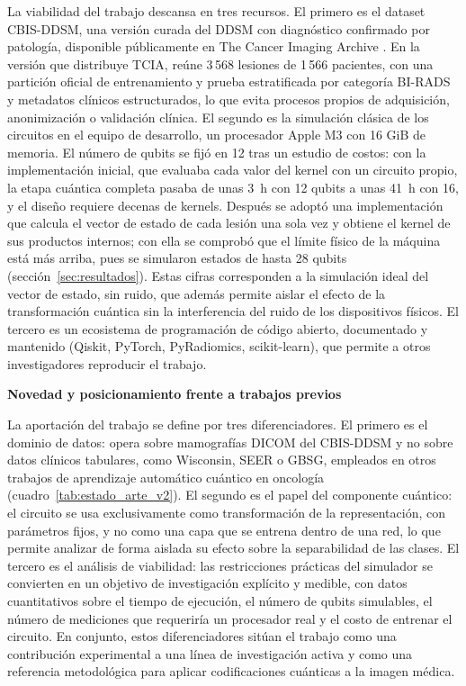 La viabilidad del trabajo descansa en tres recursos. El primero es el dataset CBIS-DDSM, una versión
curada del DDSM con diagnóstico confirmado por patología, disponible públicamente en The Cancer
Imaging Archive \cite{Lee2017CBISDDSM, Clark2013TCIA}. En la versión que distribuye TCIA, reúne 3\,568 lesiones de 1\,566 pacientes, con
una partición oficial de entrenamiento y prueba estratificada por categoría BI-RADS y metadatos
clínicos estructurados, lo que evita procesos propios de adquisición, anonimización o validación
clínica. El segundo es la simulación clásica de los circuitos en el equipo de desarrollo, un
procesador Apple M3 con 16 GiB de memoria. El número de qubits se fijó en 12 tras un estudio de
costos: con la implementación inicial, que evaluaba cada valor del kernel con un circuito propio, la
etapa cuántica completa pasaba de unas 3~h con 12 qubits a unas 41~h con 16, y el diseño requiere
decenas de kernels. Después se adoptó una implementación que calcula el vector de estado de cada
lesión una sola vez y obtiene el kernel de sus productos internos; con ella se comprobó que el límite
físico de la máquina está más arriba, pues se simularon estados de hasta 28 qubits
(sección~\ref{sec:resultados}). Estas cifras corresponden a la simulación ideal del vector de estado,
sin ruido, que además permite aislar el efecto de la transformación cuántica sin la interferencia del
ruido de los dispositivos físicos. El tercero es un ecosistema de
programación de código abierto, documentado y mantenido (Qiskit, PyTorch, PyRadiomics, scikit-learn),
que permite a otros investigadores reproducir el trabajo.

\textbf{Novedad y posicionamiento frente a trabajos previos}

La aportación del trabajo se define por tres diferenciadores. El primero es el dominio de datos:
opera sobre mamografías DICOM del CBIS-DDSM y no sobre datos clínicos tabulares, como Wisconsin, SEER o
GBSG, empleados en otros trabajos de aprendizaje automático cuántico en oncología
(cuadro~\ref{tab:estado_arte_v2}). El segundo es el papel del componente cuántico: el circuito se usa
exclusivamente como transformación de la representación, con parámetros fijos, y no como una capa que
se entrena dentro de una red, lo que permite analizar de forma aislada su efecto sobre la
separabilidad de las clases. El tercero es el análisis de viabilidad: las restricciones prácticas del
simulador se convierten en un objetivo de investigación explícito y medible, con datos cuantitativos
sobre el tiempo de ejecución, el número de qubits simulables, el número de mediciones que requeriría
un procesador real y el costo de entrenar el circuito. En conjunto, estos diferenciadores sitúan el
trabajo como una contribución experimental a una línea de investigación activa y como una referencia
metodológica para aplicar codificaciones cuánticas a la imagen médica.
